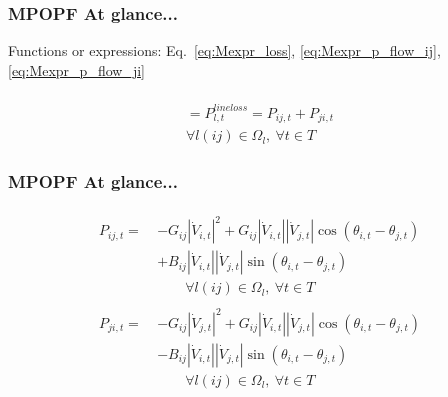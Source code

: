 \documentclass[
	11pt, %
	aspectratio=169, %
]{beamer}
\begin{document}

\begin{frame}
	\frametitle{MPOPF At glance...}

	Functions or expressions: Eq.~\eqref{eq:Mexpr_loss}, \eqref{eq:Mexpr_p_flow_ij}, \eqref{eq:Mexpr_p_flow_ji}

	\begin{gather*}
		[-G_{ij}(\left|\dot{V}_{i,t} \right|^2 + \left|\dot{V}_{j,t} \right|^2) + 2G_{ij}\left|\dot{V}_{i,t} \right|\left|\dot{V}_{j,t} \right|\cos\left(\theta_{i,t}-\theta_{j,t} \right) ] \\
		= P_{l,t}^{line loss} = P_{ij,t} + P_{ji,t} \\[1em]
		\forall l(ij) \in \Omega_{l},\ \forall t \in T
	\end{gather*}

	
\end{frame}


\begin{frame}
	\frametitle{MPOPF At glance...}

	\begin{gather*}
		\begin{aligned}
			P_{ij,t} =\ &-G_{ij} \left|\dot{V}_{i,t} \right|^2 
			+ G_{ij} \left|\dot{V}_{i,t} \right| \left|\dot{V}_{j,t} \right| \cos\left(\theta_{i,t}-\theta_{j,t} \right) \\
			&+ B_{ij} \left|\dot{V}_{i,t} \right| \left|\dot{V}_{j,t} \right| \sin\left(\theta_{i,t}-\theta_{j,t} \right) \\[1em]
			&\qquad \forall l(ij) \in \Omega_{l},\ \forall t \in T
		\end{aligned}
		\\[2em]
		\begin{aligned}
			P_{ji,t} =\ &-G_{ij} \left|\dot{V}_{j,t} \right|^2 
			+ G_{ij} \left|\dot{V}_{i,t} \right| \left|\dot{V}_{j,t} \right| \cos\left(\theta_{i,t}-\theta_{j,t} \right) \\
			&- B_{ij} \left|\dot{V}_{i,t} \right| \left|\dot{V}_{j,t} \right| \sin\left(\theta_{i,t}-\theta_{j,t} \right) \\[1em]
			&\qquad \forall l(ij) \in \Omega_{l},\ \forall t \in T
		\end{aligned}
	\end{gather*}


	
\end{frame}
\end{document}
